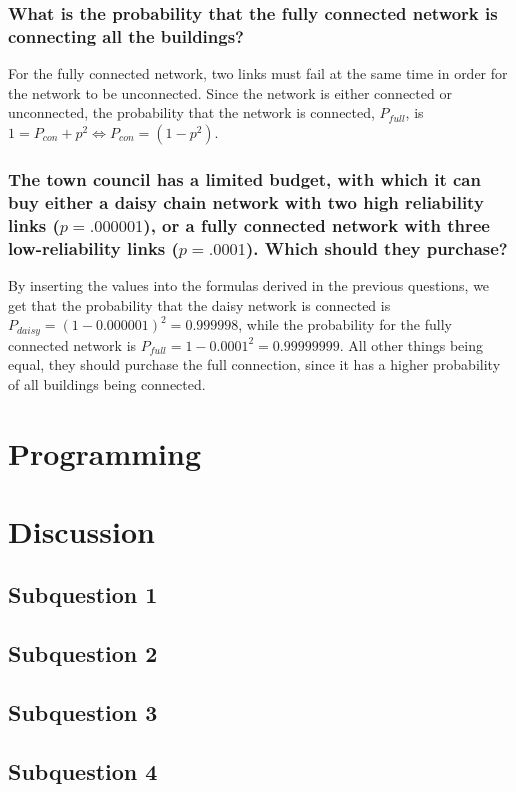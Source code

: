 \documentclass[11pt,a4paper]{article}
\begin{document}
\subsubsection*{What is the probability that the fully connected network is
                connecting all the buildings?}

For the fully connected network, two links must fail at the same time in order
for the network to be unconnected. Since the network is either connected or
unconnected, the probability that the network is connected, $P_{full}$, is $1 =
P_{con} + p^2 \Leftrightarrow P_{con} = (1-p^2)$.

\subsubsection*{The town council has a limited budget, with which it can buy
either a daisy chain network with two high reliability links ($p = .000001$),
or a fully connected network with three low-reliability links ($p = .0001$).
Which should they purchase?}

By inserting the values into the formulas derived in the previous questions,
we get that the probability that the daisy network is connected is $P_{daisy}
= (1-0.000001)^2 = 0.999998$, while the probability for the fully connected
network is $P_{full} = 1-0.0001^2 = 0.99999999$. All other things being equal,
they should purchase the full connection, since it has a higher probability of
all buildings being connected.

\section*{Programming}


\section*{Discussion}

\subsection*{Subquestion 1}


\subsection*{Subquestion 2}

\subsection*{Subquestion 3}


\subsection*{Subquestion 4}

\end{document}

